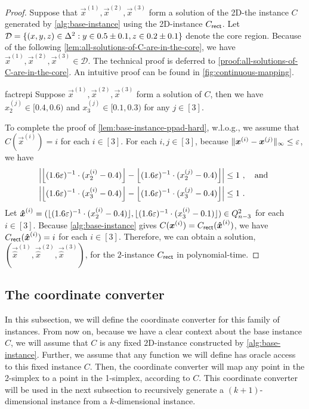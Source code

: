 \begin{proof}
    Suppose that $\vec{x}^{(1)},\vec{x}^{(2)},\vec{x}^{(3)}$ form a solution of the 2{\rm D}-\Sperner the instance $C$ generated by \cref{alg:base-instance} using the 2{\rm D}-\rect\Sperner instance $C_{{\sf rect}}$. 
    Let $\mathcal{D}=\{{(x,y,z)\in \Delta^2: y\in 0.5\pm 0.1, z\in 0.2\pm 0.1} \}$ denote the core region. Because of the following \cref{lem:all-solutions-of-C-are-in-the-core}, we have $\vec{x}^{(1)}, \vec{x}^{(2)}, \vec{x}^{(3)}\in \mathcal{D}$.
    The technical proof is deferred to \cref{proof:all-solutions-of-C-are-in-the-core}.
    An intuitive proof can be found in \cref{fig:continuous-mapping}.

\begin{restatable}[]{fact}{repi}
    \label{lem:all-solutions-of-C-are-in-the-core}
    Suppose $\vec{x}^{(1)}, \vec{x}^{(2)}, \vec{x}^{(3)}$ form a solution of $C$, then we have $x^{(j)}_2\in [0.4, 0.6)$ and $x^{(j)}_3\in [0.1, 0.3)$ for any $j\in [3]$. 
\end{restatable}

    
    To complete the proof of \cref{lem:base-instance-ppad-hard}, w.l.o.g., we assume that $C(\vec{x}^{(i)})=i$ for each $i\in [3]$.
    For each $i,j\in [3]$, because $\| {\boldsymbol{x}^{(i)}-\boldsymbol{x}^{(j)}} \|_{\infty}\leq \varepsilon$, we have 
    \begin{align*}
        \left |{\left \lfloor {(1.6\varepsilon)^{-1}\cdot (x_{2}^{(i)}-0.4)} \right \rfloor - \left \lfloor {(1.6\varepsilon)^{-1}\cdot (x_{2}^{(j)}-0.4)} \right \rfloor} \right | &\leq 1~, \quad \text{and }\\
        \left |{\left \lfloor {(1.6\varepsilon)^{-1}\cdot (x_{3}^{(i)}-0.4)} \right \rfloor - \left \lfloor {(1.6\varepsilon)^{-1}\cdot (x_{3}^{(j)}-0.4)} \right \rfloor} \right | &\leq 1~.
    \end{align*} 
    Let $\boldsymbol{\hat{x}}^{(i)} = (\lfloor {(1.6\varepsilon)^{-1}\cdot (x_{2}^{(i)}-0.4)} \rfloor, \lfloor {(1.6\varepsilon)^{-1} \cdot (x_{3}^{(i)}-0.1)} \rfloor) \in Q_{n-3}^2$ for each $i\in [3]$.
    Because \cref{alg:base-instance} gives $C(\boldsymbol{x}^{(i)})=C_{{\sf rect}}(\boldsymbol{\hat{x}}^{(i)})$, we have $C_{{\sf rect}}(\boldsymbol{\hat{x}}^{(i)}) = i$ for each $i\in [3]$. 
    Therefore, we can obtain a solution, $(\vec{\hat{x}}^{(1)}, \vec{\hat{x}}^{(2)}, \vec{\hat{x}}^{(3)})$, for the $2${\rm}-\rect\Sperner instance $C_{{\sf rect}}$ in polynomial-time.
\end{proof}


\subsection{The coordinate converter} 
\label{subsec:warmup-convert}
In this subsection, we will define the coordinate converter for this family of instances.
From now on, because we have a clear context about the base instance $C$, we will assume that $C$ is any fixed $2${\rm D}-\Sperner instance constructed by \cref{alg:base-instance}.
Further, we assume that any function we will define has oracle access to this fixed instance $C$.
Then, the coordinate converter will map any point in the 2-simplex to a point in the 1-simplex, according to $C$. 
This coordinate converter will be used in the next subsection to recursively generate a $(k+1)$-dimensional instance from a $k$-dimensional instance.

